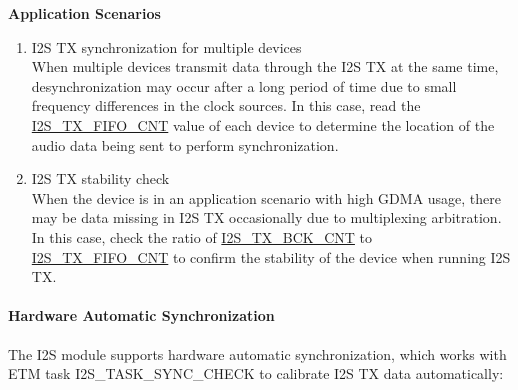 \documentclass[main\_\_EN.tex]{subfiles}
\begin{document}
\textbf{Application Scenarios}
\begin{enumerate}
    \item I2S TX synchronization for multiple devices \\
    When multiple devices transmit data through the I2S TX at the same time, desynchronization may occur after a long period of time due to small frequency differences in the clock sources. In this case, read the \hyperref[fielddesc:I2STXFIFOCNT]{I2S\_TX\_FIFO\_CNT} value of each device to determine the location of the audio data being sent to perform synchronization.
    \item I2S TX stability check\\
    When the device is in an application scenario with high GDMA usage, there may be data missing in I2S TX occasionally due to multiplexing arbitration. In this case, check the ratio of \hyperref[fielddesc:I2STXBCKCNT]{I2S\_TX\_BCK\_CNT} to \hyperref[fielddesc:I2STXFIFOCNT]{I2S\_TX\_FIFO\_CNT} to confirm the stability of the device when running I2S TX.
\end{enumerate}

\paragraph{Hardware Automatic Synchronization}

The \chipname{} I2S module supports hardware automatic synchronization, which works with ETM task I2S\_TASK\_SYNC\_CHECK to calibrate I2S TX data automatically:
\end{document}
